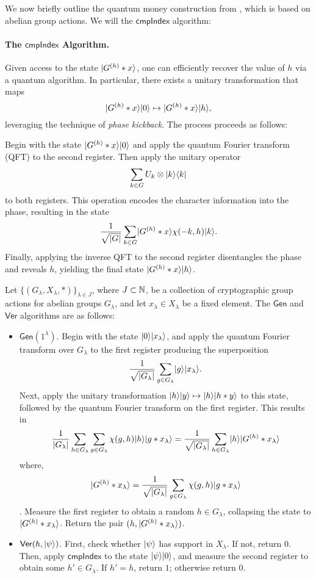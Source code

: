\documentclass[11pt]{article}
\theoremstyle{definition}
\newcommand{\comph}{\mathsf{cmpIndex}}
\newcommand{\gen}{\mathsf{Gen}}
\newcommand{\ver}{\mathsf{Ver}}
\begin{document}
We now briefly outline the quantum money construction from \cite{zhandry2024quantum}, which is based on abelian group actions. We will the $\comph$ algorithm:
\paragraph{The $\comph$ Algorithm.}
Given access to the state $\lvert G^{(h)} * x\rangle$, one can efficiently recover the value of $h$ via a quantum algorithm. In particular, there exists a unitary transformation that maps
\[
\lvert G^{(h)} * x\rangle \lvert0\rangle \mapsto \lvert G^{(h)} * x\rangle \lvert h\rangle,
\]
leveraging the technique of \textit{phase kickback}. The process proceeds as follows:

Begin with the state $\lvert G^{(h)} * x\rangle \lvert0\rangle$ and apply the quantum Fourier transform (QFT) to the second register. Then apply the unitary operator
\[
\sum_{k \in G} U_k \otimes \lvert k\rangle\langle k\rvert
\]
to both registers. This operation encodes the character information into the phase, resulting in the state
\[
\frac{1}{\sqrt{\lvert G\rvert}} \sum_{k \in G} \lvert G^{(h)} * x\rangle \chi(-k, h) \lvert k\rangle.
\]
Finally, applying the inverse QFT to the second register disentangles the phase and reveals $h$, yielding the final state $\lvert G^{(h)} * x\rangle \lvert h\rangle$.

\vspace{0.5cm}
Let $\{(G_\lambda, X_\lambda, *)\}_{\lambda \in J}$, where $J \subset \mathbb{N}$, be a collection of cryptographic group actions for abelian groups $G_\lambda$, and let $x_\lambda \in X_\lambda$ be a fixed element. The $\gen$ and $\ver$ algorithms are as follows:
\begin{itemize}
\item $\gen(1^\lambda)$. Begin with the state $\lvert0\rangle\lvert x_\lambda\rangle$, and apply the quantum Fourier transform over $G_\lambda$ to the first register producing the superposition
    \[ \frac{1}{\sqrt{\lvert G_\lambda\rvert}} \sum_{g \in G_\lambda} \lvert g\rangle\lvert x_\lambda\rangle. \]
    Next, apply the unitary transformation $\lvert h\rangle\lvert y\rangle \mapsto \lvert h\rangle\lvert h * y\rangle$ to this state, followed by the quantum Fourier transform on the first register. This results in
    \[ \frac{1}{\lvert G_\lambda\rvert} \sum_{h \in G_\lambda} \sum_{g \in G_\lambda} \chi(g, h) \lvert h\rangle\lvert g * x_\lambda\rangle = \frac{1}{\sqrt{\lvert G_\lambda\rvert}} \sum_{h \in G_\lambda} \lvert h\rangle \lvert G^{(h)} * x_\lambda\rangle \]
    where,
    \[
    \lvert G^{(h)}*x_\lambda\rangle = \frac{1}{\sqrt{|G_\lambda|}}\sum_{g \in G_\lambda}\chi(g,h)\lvert g*x_\lambda\rangle
    \]
    . Measure the first register to obtain a random $h \in G_\lambda$, collapsing the state to $\lvert G^{(h)} * x_\lambda\rangle$. Return the pair $(h, \lvert G^{(h)} * x_\lambda\rangle)$.

\item $\ver(h, \ket{\psi})$. First, check whether $\lvert\psi\rangle$ has support in $X_\lambda$. If not, return $0$. Then, apply $\comph$ to the state $\lvert\psi\rangle\lvert0\rangle$, and measure the second register to obtain some $h' \in G_\lambda$. If $h' = h$, return $1$; otherwise return $0$.
\end{itemize}
\end{document}
